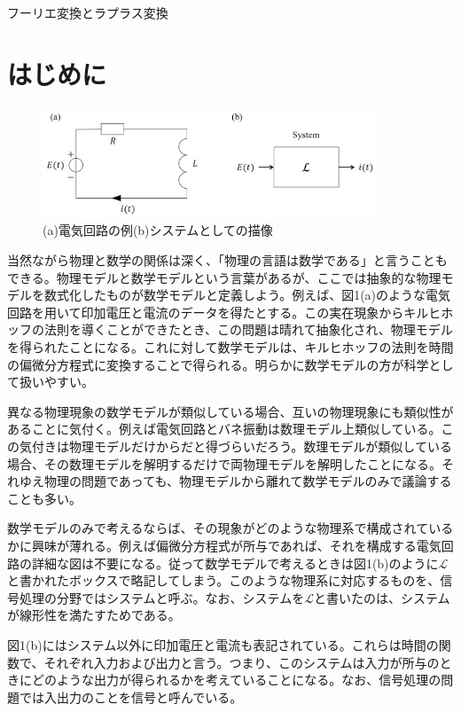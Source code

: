 \documentclass[dvipdfmx, 9pt, a4paper]{jsarticle}
\begin{document}
\begin{center}
{\fontsize{18pt}{1pt}\selectfont フーリエ変換とラプラス変換}\\
\end{center}

\section*{はじめに}
\begin{figure}[b]
\begin{center}
\includegraphics[width=10cm]{fig1.png}
\caption{(a)電気回路の例(b)システムとしての描像}
\end{center}
\end{figure}
当然ながら物理と数学の関係は深く、「物理の言語は数学である」と言うこともできる。物理モデルと数学モデルという言葉があるが、ここでは抽象的な物理モデルを数式化したものが数学モデルと定義しよう。例えば、図1(a)のような電気回路を用いて印加電圧と電流のデータを得たとする。この実在現象からキルヒホッフの法則を導くことができたとき、この問題は晴れて抽象化され、物理モデルを得られたことになる。これに対して数学モデルは、キルヒホッフの法則を時間の偏微分方程式に変換することで得られる。明らかに数学モデルの方が科学として扱いやすい。\par
異なる物理現象の数学モデルが類似している場合、互いの物理現象にも類似性があることに気付く。例えば電気回路とバネ振動は数理モデル上類似している。この気付きは物理モデルだけからだと得づらいだろう。数理モデルが類似している場合、その数理モデルを解明するだけで両物理モデルを解明したことになる。それゆえ物理の問題であっても、物理モデルから離れて数学モデルのみで議論することも多い。\par
数学モデルのみで考えるならば、その現象がどのような物理系で構成されているかに興味が薄れる。例えば偏微分方程式が所与であれば、それを構成する電気回路の詳細な図は不要になる。従って数学モデルで考えるときは図1(b)のように$\mathcal{L}$と書かれたボックスで略記してしまう。このような物理系に対応するものを、信号処理の分野ではシステムと呼ぶ。なお、システムを$\mathcal{L}$と書いたのは、システムが線形性を満たすためである。\par
図1(b)にはシステム以外に印加電圧と電流も表記されている。これらは時間の関数で、それぞれ入力および出力と言う。つまり、このシステムは入力が所与のときにどのような出力が得られるかを考えていることになる。なお、信号処理の問題では入出力のことを信号と呼んでいる。\par
\end{document}
